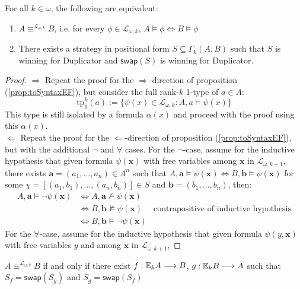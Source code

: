\begin{prop}
For all $k \in \omega$, the following are equivalent:
\begin{enumerate}[label=(\arabic*)$_{k}$]
\item $A \equiv^{\mathcal{L}_{\omega,k}} B$, i.e. for every $\phi \in \mathcal{L}_{\omega,k}$, $A \vDash \phi \Leftrightarrow B \vDash \phi$
\item There exists a strategy in positional form $S \subseteq \Gamma_{k}(A,B)$ such that $S$ is winning for Duplicator and $\mathsf{swap}(S)$ is  winning for Duplicator. 
\end{enumerate}
\begin{proof}
$\Rightarrow$ Repeat the proof for the $\Rightarrow$-direction of proposition (\ref{prop:toSyntaxEF}), but consider the full rank-$k$ 1-type of $a \in A$:
$$\text{tp}^{k}_{1}(a) := \{\psi(x) \in \mathcal{L}_{\omega,k}: A,a \vDash \psi(x) \} $$ 
This type is still isolated by a formula $\alpha(x)$ and proceed with the proof using this $\alpha(x)$. \\
$\Leftarrow$ Repeat the proof for the $\Leftarrow$-direction of proposition (\ref{prop:toSyntaxEF}), but with the additional $\neg$ and $\forall$ cases. For the $\neg$-case, assume for the inductive hypothesis that given formula $\psi(\mathbf{x})$ with free variables among $\mathbf{x}$ in $\mathcal{L}_{\omega,k+1}$, there exists $\mathbf{a} = (a_{1},\dots,a_{n}) \in A^{n}$ such that $A,\mathbf{a} \vDash \psi(\mathbf{x}) \Leftrightarrow B,\mathbf{b} \vDash \psi(\mathbf{x})$ for some $\chi = [(a_{1},b_{1}),\dots,(a_{n},b_{n})] \in S$ and $\mathbf{b} = (b_{1},\dots,b_{n})$, then:
\begin{align*}
A,\mathbf{a} \vDash \neg\psi(\mathbf{x}) &\Leftrightarrow A,\mathbf{a} \not\vDash \psi(\mathbf{x}) \\
&\Leftrightarrow B,\mathbf{b} \not\vDash \psi(\mathbf{x})  & \text{contrapositive of inductive hypothesis}\\
&\Leftrightarrow B,\mathbf{b} \vDash \neg\psi(\mathbf{x}) 
\end{align*}
For the $\forall$-case, assume for the inductive hypothesis that given formula $\psi(y,\mathbf{x})$ with free variables $y$ and among $\mathbf{x}$ in $\mathcal{L}_{\omega,k+1}$, 
\end{proof}
\begin{cor}
$A \equiv^{\mathcal{L}_{\omega,k}} B$ if and only if there exist $f:{\mathbb{E}_{k}A} \longrightarrow B$, $g:{\mathbb{E}_{k}B} \longrightarrow A$ such that $S_{f} = \mathsf{swap}(S_{g})$ and $S_{g} = \mathsf{swap}(S_{f})$ 
\label{cor:backForthEF}
\end{cor}
\end{prop}
